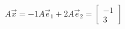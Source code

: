 \documentclass[preview]{standalone}
\begin{document}
\begin{align*}
A\vec{x}=-1A\vec{e}_1+2A\vec{e}_2=\begin{bmatrix}-1\\3\end{bmatrix}
\end{align*}
\end{document}
